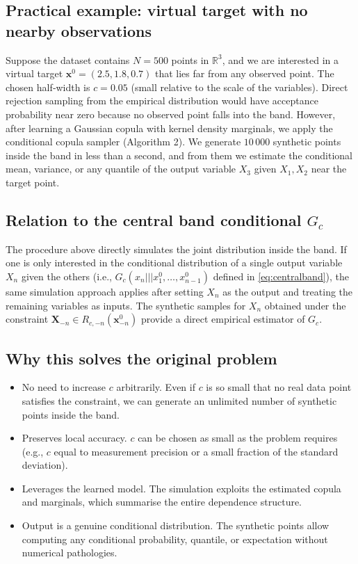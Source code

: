 \subsection{Practical example: virtual target with no nearby observations}

Suppose the dataset contains $N=500$ points in $\mathbb{R}^3$, and we are interested in a virtual target $\mathbf{x}^0 = (2.5, 1.8, 0.7)$ that lies far from any observed point. The chosen half‑width is $c=0.05$ (small relative to the scale of the variables). Direct rejection sampling from the empirical distribution would have acceptance probability near zero because no observed point falls into the band. However, after learning a Gaussian copula with kernel density marginals, we apply the conditional copula sampler (Algorithm 2). We generate $10\,000$ synthetic points inside the band in less than a second, and from them we estimate the conditional mean, variance, or any quantile of the output variable $X_3$ given $X_1,X_2$ near the target point.

\subsection{Relation to the central band conditional $G_c$}

The procedure above directly simulates the joint distribution inside the band. If one is only interested in the conditional distribution of a single output variable $X_n$ given the others (i.e., $G_c(x_n ||| x_1^0,\dots,x_{n-1}^0)$ defined in \eqref{eq:centralband}), the same simulation approach applies after setting $X_n$ as the output and treating the remaining variables as inputs. The synthetic samples for $X_n$ obtained under the constraint $\mathbf{X}_{-n} \in R_{c,-n}(\mathbf{x}_{-n}^0)$ provide a direct empirical estimator of $G_c$.

\subsection{Why this solves the original problem}

\begin{itemize}
    \item No need to increase $c$ arbitrarily. Even if $c$ is so small that no real data point satisfies the constraint, we can generate an unlimited number of synthetic points inside the band.
    \item Preserves local accuracy. $c$ can be chosen as small as the problem requires (e.g., $c$ equal to measurement precision or a small fraction of the standard deviation).
    \item Leverages the learned model. The simulation exploits the estimated copula and marginals, which summarise the entire dependence structure.
    \item Output is a genuine conditional distribution. The synthetic points allow computing any conditional probability, quantile, or expectation without numerical pathologies.
\end{itemize}

